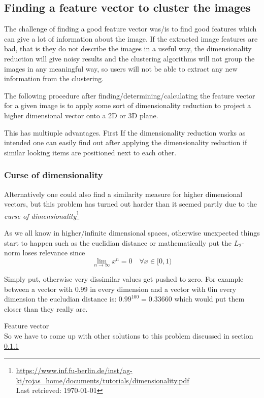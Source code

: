 \documentclass[journal]{vgtc}       %
\begin{document}
\subsection{Finding a feature vector to cluster the images}\label{sec:featurev}

The challenge of finding a good feature vector was/is to find good features which can give a lot of information about the image.
If the extracted image features are bad, that is they do not describe the images in a useful way, the dimensionality reduction will give noisy results and the clustering algorithms will not group the images in any meaningful way, so users will not be able to extract any new information from the clustering.

The following procedure after finding/determining/calculating the feature vector for a given image is to apply some sort of dimensionality reduction to project a higher dimensional vector onto a 2D or 3D plane.

This has multiuple advantages. First If the dimensionality reduction works as intended one can easily find out after applying the dimensionality reduction if similar looking items are positioned next to each other.

\subsubsection{Curse of dimensionality}
Alternatively one could also find a similarity measure for higher dimensional vectors, but this problem has turned out harder than it seemed partly due to the \textit{curse of dimensionality}\footnote{\url{https://www.inf.fu-berlin.de/inst/ag-ki/rojas_home/documents/tutorials/dimensionality.pdf}\\ Last retrieved: \today}


As we all know in higher/infinite dimensional spaces, otherwise unexpected things start to happen such as the euclidian distance or mathematically put the \(L_2\)-norm loses relevance since
\begin{equation}
\lim_{n\rightarrow \infty} x^n = 0 \quad \forall x \in [0,1)
\end{equation}

Simply put, otherwise very dissimilar values get pushed to zero. For example between a vector with \(0.99\) in every dimension and a vector with \(0\)in every dimension the eucludian distance is: \(0.99^{100} = 0.33660\) which would put them closer than they really are.

Feature vector \\
So we have to come up with other solutions to this problem discussed in section \ref{}
\end{document}
